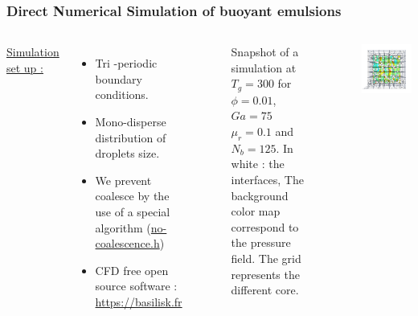 \documentclass{sintefbeamer}
\begin{document}
\begin{frame}
\frametitle{Direct Numerical Simulation of buoyant emulsions}
\begin{columns}
\underline{Simulation set up :} 
\begin{itemize}
  \item Tri -periodic boundary conditions. 
  \item Mono-disperse distribution of droplets size.
  \item We prevent coalesce by the use of a special algorithm 
  (\href{http://basilisk.fr/sandbox/fintzin/Rising-Suspension/no-coalescence.h}{no-coalescence.h})
  \item CFD free open source software : \url{https://basilisk.fr}
\end{itemize}

\begin{figure}
  \caption{Snapshot of a simulation at $T_g = 300$ for $\phi = 0.01$, $Ga = 75$ $\mu_r = 0.1$ and $N_b = 125$. In white : the interfaces, The background color map correspond to the pressure field. The grid represents the different core.
  }
\end{figure}
\centering
\includegraphics[width =  1.1\textwidth]{image/PHI_01_Ga_75.png}
\end{columns}
\end{frame}
\end{document}
